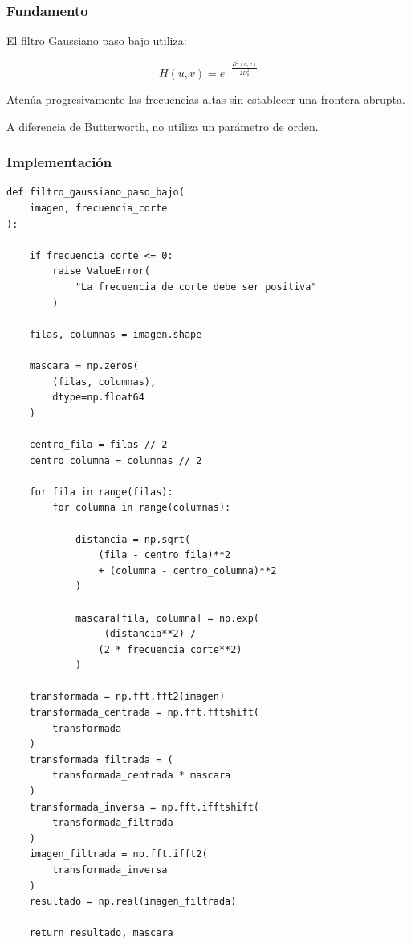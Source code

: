 \documentclass[11pt,letterpaper]{article}
\begin{document}
\subsubsection*{Fundamento}

El filtro Gaussiano paso bajo utiliza:

\begin{equation}
H(u,v)=
e^{-\frac{D^2(u,v)}{2D_0^2}}
\end{equation}

Atenúa progresivamente las frecuencias
altas sin establecer una frontera abrupta.

A diferencia de Butterworth, no utiliza
un parámetro de orden.

\subsubsection*{Implementación}

\begin{lstlisting}
def filtro_gaussiano_paso_bajo(
    imagen, frecuencia_corte
):

    if frecuencia_corte <= 0:
        raise ValueError(
            "La frecuencia de corte debe ser positiva"
        )

    filas, columnas = imagen.shape

    mascara = np.zeros(
        (filas, columnas),
        dtype=np.float64
    )

    centro_fila = filas // 2
    centro_columna = columnas // 2

    for fila in range(filas):
        for columna in range(columnas):

            distancia = np.sqrt(
                (fila - centro_fila)**2
                + (columna - centro_columna)**2
            )

            mascara[fila, columna] = np.exp(
                -(distancia**2) /
                (2 * frecuencia_corte**2)
            )

    transformada = np.fft.fft2(imagen)
    transformada_centrada = np.fft.fftshift(
        transformada
    )
    transformada_filtrada = (
        transformada_centrada * mascara
    )
    transformada_inversa = np.fft.ifftshift(
        transformada_filtrada
    )
    imagen_filtrada = np.fft.ifft2(
        transformada_inversa
    )
    resultado = np.real(imagen_filtrada)

    return resultado, mascara
\end{lstlisting}
\end{document}
